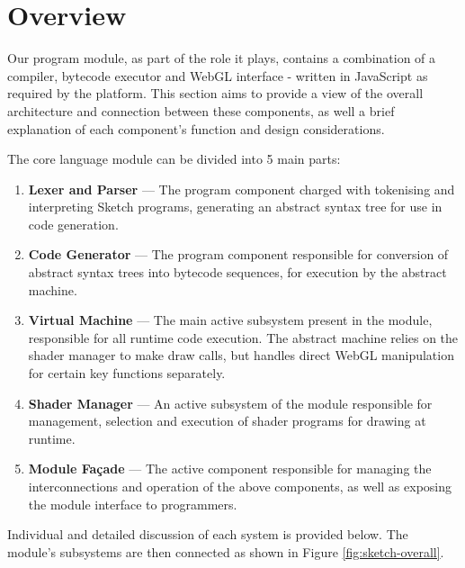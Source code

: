\documentclass{l3proj}
\begin{document}
\section{Overview}
\label{arch-over}

Our program module, as part of the role it plays, contains a combination of a compiler, bytecode executor and WebGL interface - written in JavaScript as required by the platform. This section aims to provide a view of the overall architecture and connection between these components, as well a brief explanation of each component's function and design considerations.

The core language module can be divided into 5 main parts:
\begin{enumerate}
\item \textbf{Lexer and Parser} --- The program component charged with tokenising and interpreting Sketch programs, generating an abstract syntax tree for use in code generation.
\item \textbf{Code Generator} --- The program component responsible for conversion of abstract syntax trees into bytecode sequences, for execution by the abstract machine.
\item \textbf{Virtual Machine} --- The main active subsystem present in the module, responsible for all runtime code execution. The abstract machine relies on the shader manager to make draw calls, but handles direct WebGL manipulation for certain key functions separately.
\item \textbf{Shader Manager} --- An active subsystem of the module responsible for management, selection and execution of shader programs for drawing at runtime.
\item \textbf{Module Fa\c{c}ade} --- The active component responsible for managing the interconnections and operation of the above components, as well as exposing the module interface to programmers.
\end{enumerate}
Individual and detailed discussion of each system is provided below. The module's subsystems are then connected as shown in Figure \ref{fig:sketch-overall}.
\end{document}
